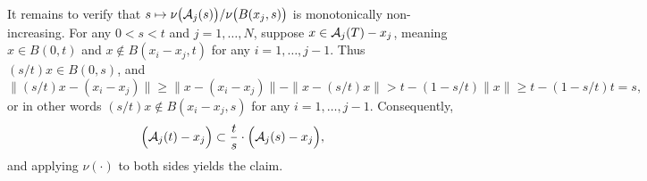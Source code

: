 	It remains to verify that $s \mapsto \nu\bigl(\mathcal{A}_j(s)\bigr)/\nu\bigl(B(x_j,s)\bigr)$ is monotonically non-increasing. For any $0 < s < t$ and $j = 1,\ldots,N$, suppose $x \in \mathcal{A}_j(T) - x_j$, meaning $x \in B(0,t)$ and $x \not\in B(x_i - x_j,t)$ for any $i = 1,\ldots,j - 1$. Thus $(s/t)x \in B(0,s)$, and
	\begin{equation*}
	\|(s/t)x - (x_i - x_j)\| \geq \|x - (x_i - x_j)\| - \|x - (s/t)x\| > t - (1 - s/t)\|x\| \geq t - (1 - s/t)t = s,
	\end{equation*}
	or in other words $(s/t)x \not\in B(x_i - x_j,s)$ for any $i = 1,\ldots,j - 1$. Consequently,
	\begin{equation*}
	\Bigl(\mathcal{A}_j(t) - x_j\Bigr) \subset \frac{t}{s} \cdot \Bigl(\mathcal{A}_{j}(s)- x_j\Bigr),
	\end{equation*}
	and applying $\nu(\cdot)$ to both sides yields the claim.
	
